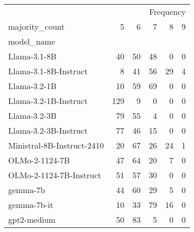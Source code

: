 \begin{tabular}{lrrrrr}
\toprule
 & \multicolumn{5}{r}{Frequency} \\
majority_count & 5 & 6 & 7 & 8 & 9 \\
model_name &  &  &  &  &  \\
\midrule
Llama-3.1-8B & 40 & 50 & 48 & 0 & 0 \\
Llama-3.1-8B-Instruct & 8 & 41 & 56 & 29 & 4 \\
Llama-3.2-1B & 10 & 59 & 69 & 0 & 0 \\
Llama-3.2-1B-Instruct & 129 & 9 & 0 & 0 & 0 \\
Llama-3.2-3B & 79 & 55 & 4 & 0 & 0 \\
Llama-3.2-3B-Instruct & 77 & 46 & 15 & 0 & 0 \\
Ministral-8B-Instruct-2410 & 20 & 67 & 26 & 24 & 1 \\
OLMo-2-1124-7B & 47 & 64 & 20 & 7 & 0 \\
OLMo-2-1124-7B-Instruct & 51 & 57 & 30 & 0 & 0 \\
gemma-7b & 44 & 60 & 29 & 5 & 0 \\
gemma-7b-it & 10 & 33 & 79 & 16 & 0 \\
gpt2-medium & 50 & 83 & 5 & 0 & 0 \\
\bottomrule
\end{tabular}
